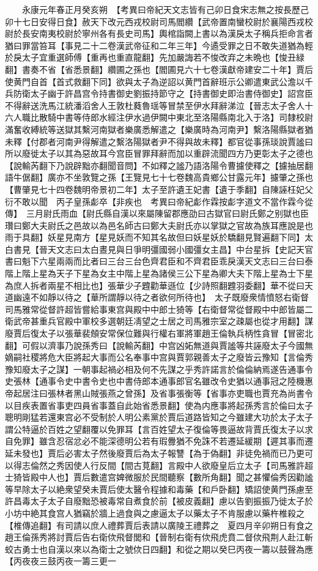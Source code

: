 　　永康元年春正月癸亥朔　【考異曰帝紀天文志皆有己卯日食宋志無之按長歷己卯十七日安得日食】赦天下改元西戎校尉司馬閻纘【武帝置南蠻校尉於襄陽西戎校尉於長安南夷校尉於寧州各有長史司馬】輿棺詣闕上書以為漢戾太子稱兵拒命言者猶曰罪當笞耳【事見二十二卷漢武帝征和二年三年】今遹受罪之日不敢失道猶為輕於戾太子宜重選師傅【重再也重直龍翻】先加嚴誨若不悛改弃之未晩也【悛丑緑翻】書奏不省【省悉景翻】纘圃之孫也【閻圃見六十七卷漢獻帝建安二十年】賈后使黄門自首【首式救翻下同】欲與太子為逆詔以黄門首辭班示公卿遣東武公澹以千兵防衛太子幽于許昌宫令持書御史劉振持節守之【持書御史即治書侍御史】詔宫臣不得辭送洗馬江統潘滔舍人王敦杜蕤魯瑶等冒禁至伊水拜辭涕泣【晉志太子舍人十六人職比散騎中書等侍郎水經注伊水過伊闕中東北至洛陽縣南北入于洛】司隸校尉滿奮收縛統等送獄其繫河南獄者樂廣悉解遣之【樂廣時為河南尹】繫洛陽縣獄者猶未釋【付郡者河南尹得解遣之繫洛陽獄者尹不得與故未釋】都官從事孫琰說賈謐曰所以廢徙太子以其為惡故耳今宫臣冒罪拜辭而加以重辟流聞四方乃更彰太子之德也【說輸芮翻下乃說辟黜亦翻聞音問】不如釋之謐乃語洛陽令曹攄使釋之【攄抽居翻語牛倨翻】廣亦不坐敦覽之孫【王覽見七十七卷魏高貴鄉公甘露元年】攄肇之孫也【曹肇見七十四卷魏明帝景初二年】太子至許遺王妃書【遺于季翻】自陳誣枉妃父衍不敢以聞　丙子皇孫虨卒【非疾也　考異曰帝紀虨作霖按虨字道文不當作霖今從傳】　三月尉氏雨血【尉氏縣自漢以來屬陳留郡應劭曰古獄官曰尉氏鄭之别獄也臣瓚曰鄭大夫尉氏之邑故以為邑名師古曰鄭大夫尉氏亦以掌獄之官故為族耳應說是也雨于具翻】妖星見南方【星見妖而不知其名故但曰妖星妖於驕翻見賢遍翻下同】太白書見【晉天文志曰太白晝見與日爭明彊國弱小國彊女主昌】中台星拆【史記天官書曰魁下六星兩兩而比者曰三台三台色齊君臣和不齊君臣乖戾漢天文志曰三台曰泰階上階上星為天子下星為女主中階上星為諸侯三公下星為卿大夫下階上星為士下星為庶人拆者兩星不相比也】張華少子韙勸華遜位【少詩照翻韙羽委翻】華不從曰天道幽遠不如靜以待之【華所謂靜以待之者欲何所待也】　太子既廢衆情憤怒右衛督司馬雅常從督許超皆嘗給事東宫與殿中中郎士猗等【右衛督常從督殿中中郎皆屬二衛武帝甚重兵官殿中軍校多選朝廷凊望之士居之司馬雅宗室之疎屬也從才用翻】謀廢賈后復太子以張華裴頠安常保位難與行權右軍將軍趙王倫執兵柄性貪冒【冒密北翻】可假以濟事乃說孫秀曰【說輸芮翻】中宫凶妬無道與賈謐等共誣廢太子今國無嫡嗣社稷將危大臣將起大事而公名奉事中宫與賈郭親善太子之廢皆云豫知【言倫秀豫知廢太子之謀】一朝事起禍必相及何不先謀之乎秀許諾言於倫倫納焉遂告通事令史張林【通事令史中書令史也中書侍郎本通事郎官名雖改令史猶以通事冠之陸機惠帝起居注曰張林者黑山賊張燕之曾孫】及省事張衡等【省事亦吏職也賈充為尚書令以目疾表置省事吏四員省事蓋自此始省悉景翻】使為内應事將起孫秀言於倫曰太子聰明剛猛若還東宫必不受制於人明公素黨於賈后道路皆知之今雖建大功於太子太子謂公特逼於百姓之望翻覆以免罪耳【言百姓望太子復倫等畏逼故背賈氏復太子以求自免罪】雖含忍宿忿必不能深德明公若有瑕釁猶不免誅不若遷延緩期【遲其事而遷延未發也】賈后必害太子然後廢賈后為太子報讐【為于偽翻】非徒免禍而已乃更可以得志倫然之秀因使人行反間【間古莧翻】言殿中人欲廢皇后立太子【司馬雅許超士猗皆殿中人也】賈后數遣宫婢微服於民間聽察【數所角翻】聞之甚懼倫秀因勸謐等早除太子以絶衆望癸未賈后使太醫令程據和毒藥【和戶卧翻】矯詔使黄門孫慮至許昌毒太子太子自廢黜恐被毒常自煮食於前【被皮義翻】慮以告劉振振乃徙太子於小坊中絶其食宫人猶竊於牆上過食與之慮逼太子以藥太子不肯服慮以藥杵椎殺之【椎傳追翻】有司請以庶人禮葬賈后表請以廣陵王禮葬之　夏四月辛卯朔日有食之　趙王倫孫秀將討賈后告右衛佽飛督閭和【晉制右衛有佽飛虎賁二督佽飛荆人赴江斬蛟古勇士也自漢以來以為衛士之號佽日四翻】和從之期以癸巳丙夜一籌以鼓聲為應【丙夜夜三鼓丙夜一籌三更一